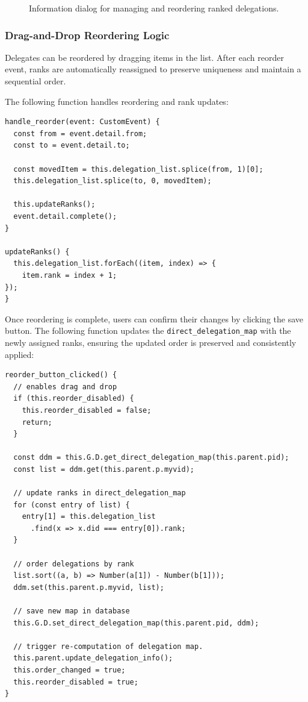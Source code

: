 \begin{figure}[H]
  \caption{Information dialog for managing and reordering ranked delegations.}
\end{figure}

\subsubsection{Drag-and-Drop Reordering Logic}

Delegates can be reordered by dragging items in the list. After each reorder event, ranks are automatically reassigned to preserve uniqueness and maintain a sequential order.

The following  function handles reordering and rank updates:

\begin{verbatim}
handle_reorder(event: CustomEvent) {
  const from = event.detail.from;
  const to = event.detail.to;

  const movedItem = this.delegation_list.splice(from, 1)[0];
  this.delegation_list.splice(to, 0, movedItem);

  this.updateRanks();
  event.detail.complete();
}

updateRanks() {
  this.delegation_list.forEach((item, index) => {
    item.rank = index + 1;
});
}
\end{verbatim}

Once reordering is complete, users can confirm their changes by clicking the save button. The following function updates the \texttt{direct\_delegation\_map} with the newly assigned ranks, ensuring the updated order is preserved and consistently applied:

\begin{verbatim}
reorder_button_clicked() {
  // enables drag and drop
  if (this.reorder_disabled) {
    this.reorder_disabled = false;
    return;
  }

  const ddm = this.G.D.get_direct_delegation_map(this.parent.pid);
  const list = ddm.get(this.parent.p.myvid);

  // update ranks in direct_delegation_map
  for (const entry of list) {
    entry[1] = this.delegation_list
      .find(x => x.did === entry[0]).rank;
  }

  // order delegations by rank
  list.sort((a, b) => Number(a[1]) - Number(b[1]));
  ddm.set(this.parent.p.myvid, list);

  // save new map in database
  this.G.D.set_direct_delegation_map(this.parent.pid, ddm);

  // trigger re-computation of delegation map.
  this.parent.update_delegation_info();
  this.order_changed = true;
  this.reorder_disabled = true;
}
\end{verbatim}

